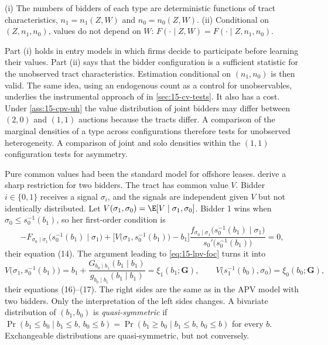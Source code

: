 \begin{assumption}\label{ass:15-cpv-uh}
(i) The numbers of bidders of each type are deterministic functions of tract characteristics,
$n_1=n_1(Z,W)$ and $n_0=n_0(Z,W)$. (ii) Conditional on $(Z,n_1,n_0)$, values do not depend on $W$:
$F(\cdot\mid Z,W)=F(\cdot\mid Z,n_1,n_0)$.
\end{assumption}

Part (i) holds in entry models in which firms decide to participate before learning their values. Part (ii)
says that the bidder configuration is a sufficient statistic for the unobserved tract characteristics.
Estimation conditional on $(n_1,n_0)$ is then valid. The same idea, using an endogenous count as a control
for unobservables, underlies the instrumental approach of \citet{HaileHongShum2003} in
\cref{sec:15-cv-tests}. It also has a cost. Under \cref{ass:15-cpv-uh} the value distribution of joint bidders
may differ between $(2,0)$ and $(1,1)$ auctions because the tracts differ. A comparison of the marginal
densities of a type across configurations therefore tests for unobserved heterogeneity. A comparison of joint
and solo densities within the $(1,1)$ configuration tests for asymmetry.

 Pure common values had been the standard model for
offshore leases. \citet{CampoPerrigneVuong2003} derive a sharp restriction for two bidders. The tract has
common value $V$. Bidder $i\in\{0,1\}$ receives a signal $\sigma_i$, and the signals are independent given
$V$ but not identically distributed. Let $V(\sigma_1,\sigma_0)=\E[V\mid\sigma_1,\sigma_0]$. Bidder 1 wins
when $\sigma_0\le s_0^{-1}(b_1)$, so her first-order condition is
\begin{equation*}
  -F_{\sigma_0\mid\sigma_1}\bigl(s_0^{-1}(b_1)\mid\sigma_1\bigr)
  +\bigl[V\bigl(\sigma_1,s_0^{-1}(b_1)\bigr)-b_1\bigr]
  \frac{f_{\sigma_0\mid\sigma_1}\bigl(s_0^{-1}(b_1)\mid\sigma_1\bigr)}{s_0'\bigl(s_0^{-1}(b_1)\bigr)}=0,
\end{equation*}
their equation (14). The argument leading to \eqref{eq:15-lpv-foc} turns it into
\begin{equation}\label{eq:15-cpv-cv}
  V\bigl(\sigma_1,s_0^{-1}(b_1)\bigr)=b_1+\frac{G_{b_0\mid b_1}(b_1\mid b_1)}{g_{b_0\mid b_1}(b_1\mid b_1)}=\xi_1(b_1;\bm G),
  \qquad
  V\bigl(s_1^{-1}(b_0),\sigma_0\bigr)=\xi_0(b_0;\bm G),
\end{equation}
their equations (16)--(17). The right sides are the same as in the APV model with two bidders. Only the
interpretation of the left sides changes. A bivariate distribution of $(b_1,b_0)$ is
\emph{quasi-symmetric} if $\Pr(b_1\le b_0\mid b_1\le b,\,b_0\le b)=\Pr(b_1\ge b_0\mid b_1\le b,\,b_0\le
b)$ for every $b$. Exchangeable distributions are quasi-symmetric, but not conversely.

